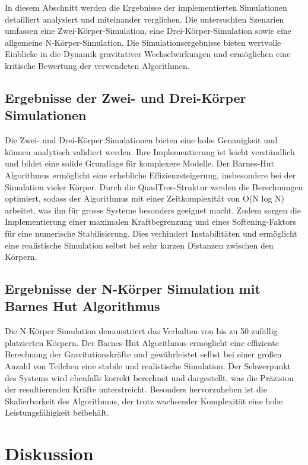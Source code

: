 \documentclass[a4paper,12pt,twoside]{article}
\begin{document}
In diesem Abschnitt werden die Ergebnisse der implementierten Simulationen detailliert analysiert und miteinander verglichen. Die untersuchten Szenarien umfassen eine Zwei-Körper-Simulation, eine Drei-Körper-Simulation sowie eine allgemeine N-Körper-Simulation. Die Simulationsergebnisse bieten wertvolle Einblicke in die Dynamik gravitativer Wechselwirkungen und ermöglichen eine kritische Bewertung der verwendeten Algorithmen.
\subsection{Ergebnisse der Zwei- und Drei-Körper Simulationen}
Die Zwei- und Drei-Körper Simulationen bieten eine hohe Genauigkeit und können analytisch validiert werden. Ihre Implementierung ist leicht verständlich und bildet eine solide Grundlage für komplexere Modelle. Der Barnes-Hut Algorithmus ermöglicht eine erhebliche Effizienzsteigerung, insbesondere bei der Simulation vieler Körper. Durch die QuadTree-Struktur werden die Berechnungen optimiert, sodass der Algorithmus mit einer Zeitkomplexität von O(N log N) arbeitet, was ihn für grosse Systeme besonders geeignet macht. Zudem sorgen die Implementierung einer maximalen Kraftbegrenzung und eines Softening-Faktors für eine numerische Stabilisierung. Dies verhindert Instabilitäten und ermöglicht eine realistische Simulation selbst bei sehr kurzen Distanzen zwischen den Körpern.

\subsection{Ergebnisse der N-Körper Simulation mit Barnes Hut Algorithmus}
Die N-Körper Simulation demonstriert das Verhalten von bis zu 50 zufällig platzierten Körpern. Der Barnes-Hut Algorithmus ermöglicht eine effiziente Berechnung der Gravitationskräfte und gewährleistet selbst bei einer großen Anzahl von Teilchen eine stabile und realistische Simulation. Der Schwerpunkt des Systems wird ebenfalls korrekt berechnet und dargestellt, was die Präzision der resultierenden Kräfte unterstreicht. Besonders hervorzuheben ist die Skalierbarkeit des Algorithmus, der trotz wachsender Komplexität eine hohe Leistungsfähigkeit beibehält.


\section{Diskussion}
\end{document}
